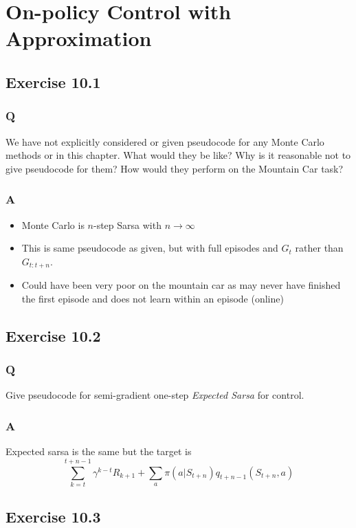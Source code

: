\section{On-policy Control with Approximation}

\subsection{Exercise 10.1}
\subsubsection{Q}
We have not explicitly considered or given pseudocode for any Monte Carlo methods or in this chapter. What would they be like? Why is it reasonable not to give pseudocode for them? How would they perform on the Mountain Car task?

\subsubsection{A}
\begin{itemize}
    \item Monte Carlo is $n$-step Sarsa with $n \to \infty$
    \item This is same pseudocode as given, but with full episodes and $G_t$ rather than $G_{t:t+n}$.
    \item Could have been very poor on the mountain car as may never have finished the first episode and does not learn within an episode (online)
\end{itemize}

\subsection{Exercise 10.2}
\subsubsection{Q}
Give pseudocode for semi-gradient one-step \emph{Expected Sarsa} for control.

\subsubsection{A}
Expected sarsa is the same but the target is 
\[
    \sum_{k=t}^{t +n -1} \gamma^{k-t} R_{k + 1} + \sum_a \pi(a \vert{} S_{t+n}) q_{t + n -1}(S_{t+n}, a)
\]

\subsection{Exercise 10.3}
